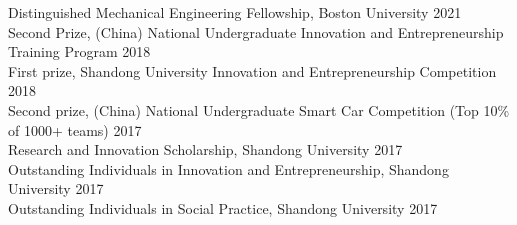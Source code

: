 
Distinguished Mechanical Engineering Fellowship, Boston University \hfill 2021\\
Second Prize, (China) National Undergraduate Innovation and Entrepreneurship Training Program \hfill 2018\\
First prize, Shandong University Innovation and Entrepreneurship Competition \hfill 2018\\
Second prize, (China) National Undergraduate Smart Car Competition (Top 10\% of 1000+ teams) \hfill 2017\\
Research and Innovation Scholarship, Shandong University \hfill 2017\\
Outstanding Individuals in Innovation and Entrepreneurship, Shandong University \hfill 2017\\ 
Outstanding Individuals in Social Practice, Shandong University \hfill 2017\\